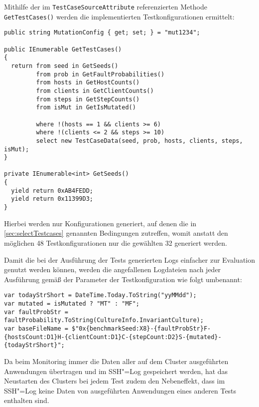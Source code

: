 Mithilfe der im \texttt{TestCaseSourceAttribute} referenzierten Methode \texttt{GetTestCases()} werden die implementierten Testkonfigurationen ermittelt:

\begin{lstlisting}[label=lstgetTestCases:,style=cs,
caption={[Implementierung der Testkonfigurationen]
    Implementierung der Testkonfigurationen (gekürzt).
    Die hier nicht gezeigten Methoden zur Rückgabe der implementierten Werte wie \texttt{GetFaultProbabilities()} sind nach dem gleichen Schema aufgebaut wie \texttt{GetSeeds()}.
    Mithilfe der Eigenschaft \texttt{MutationConfig} erfolgt die Auswahl des zu verwendeten Mutationsszenarios bei Mutationstests (vgl. \cref{subsec:clusterBasics,sec:implMutationTests}).}]
public string MutationConfig { get; set; } = "mut1234";

public IEnumerable GetTestCases()
{
  return from seed in GetSeeds()
         from prob in GetFaultProbabilities()
         from hosts in GetHostCounts()
         from clients in GetClientCounts()
         from steps in GetStepCounts()
         from isMut in GetIsMutated()
         
         where !(hosts == 1 && clients >= 6)
         where !(clients <= 2 && steps >= 10)
         select new TestCaseData(seed, prob, hosts, clients, steps, isMut);
}

private IEnumerable<int> GetSeeds()
{
  yield return 0xAB4FEDD;
  yield return 0x11399D3;
}
\end{lstlisting}

Hierbei werden nur Konfigurationen generiert, auf denen die in \cref{sec:selectTestcases} genannten Bedingungen zutreffen, womit anstatt den möglichen 48 Testkonfigurationen nur die gewählten 32 generiert werden.

Damit die bei der Ausführung der Tests generierten Logs einfacher zur Evaluation genutzt werden können, werden die angefallenen Logdateien nach jeder Ausführung gemäß der Parameter der Testkonfiguration wie folgt umbenannt:

\begin{lstlisting}[label=lst:moveTestCaseLogs,style=cs,
caption={Bestimmung des Dateinamens zur Umbenennung der Logdateien}]
var todayStrShort = DateTime.Today.ToString("yyMMdd");
var mutated = isMutated ? "MT" : "MF";
var faultProbStr = faultProbability.ToString(CultureInfo.InvariantCulture);
var baseFileName = $"0x{benchmarkSeed:X8}-{faultProbStr}F-{hostsCount:D1}H-{clientCount:D1}C-{stepCount:D2}S-{mutated}-{todayStrShort}";
\end{lstlisting}

Da beim Monitoring immer die Daten aller auf dem Cluster ausgeführten Anwendungen übertragen und im SSH"=Log gespeichert werden, hat das Neustarten des Clusters bei jedem Test zudem den Nebeneffekt, dass im SSH"=Log keine Daten von ausgeführten Anwendungen eines anderen Tests enthalten sind.
